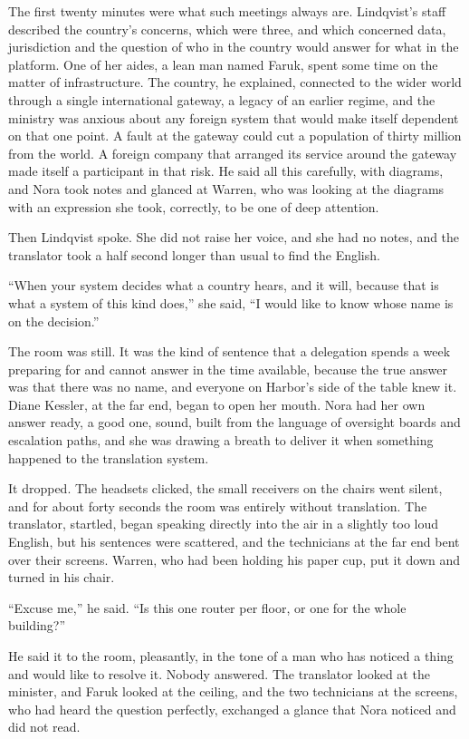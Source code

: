 The first twenty minutes were what such meetings always are. Lindqvist's staff described the country's concerns, which were three, and which concerned data, jurisdiction and the question of who in the country would answer for what in the platform. One of her aides, a lean man named Faruk, spent some time on the matter of infrastructure. The country, he explained, connected to the wider world through a single international gateway, a legacy of an earlier regime, and the ministry was anxious about any foreign system that would make itself dependent on that one point. A fault at the gateway could cut a population of thirty million from the world. A foreign company that arranged its service around the gateway made itself a participant in that risk. He said all this carefully, with diagrams, and Nora took notes and glanced at Warren, who was looking at the diagrams with an expression she took, correctly, to be one of deep attention.

Then Lindqvist spoke. She did not raise her voice, and she had no notes, and the translator took a half second longer than usual to find the English.

``When your system decides what a country hears, and it will, because that is what a system of this kind does,'' she said, ``I would like to know whose name is on the decision.''

The room was still. It was the kind of sentence that a delegation spends a week preparing for and cannot answer in the time available, because the true answer was that there was no name, and everyone on Harbor's side of the table knew it. Diane Kessler, at the far end, began to open her mouth. Nora had her own answer ready, a good one, sound, built from the language of oversight boards and escalation paths, and she was drawing a breath to deliver it when something happened to the translation system.

It dropped. The headsets clicked, the small receivers on the chairs went silent, and for about forty seconds the room was entirely without translation. The translator, startled, began speaking directly into the air in a slightly too loud English, but his sentences were scattered, and the technicians at the far end bent over their screens. Warren, who had been holding his paper cup, put it down and turned in his chair.

``Excuse me,'' he said. ``Is this one router per floor, or one for the whole building?''

He said it to the room, pleasantly, in the tone of a man who has noticed a thing and would like to resolve it. Nobody answered. The translator looked at the minister, and Faruk looked at the ceiling, and the two technicians at the screens, who had heard the question perfectly, exchanged a glance that Nora noticed and did not read.

